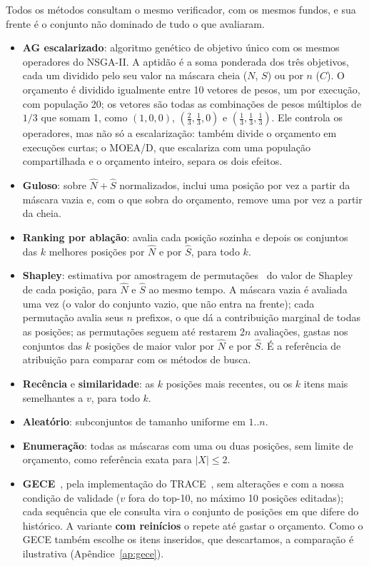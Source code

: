 Todos os métodos consultam o mesmo verificador, com os mesmos fundos, e sua
frente é o conjunto não dominado de tudo o que avaliaram.
\begin{itemize}
  \item \textbf{AG escalarizado}: algoritmo genético de objetivo único com os
        mesmos operadores do NSGA-II. A aptidão é a soma ponderada dos três
        objetivos, cada um dividido pelo seu valor na máscara cheia ($N$, $S$)
        ou por $n$ ($C$). O orçamento é dividido igualmente entre 10 vetores de
        pesos, um por execução, com população 20; os vetores são todas as
        combinações de pesos múltiplos de $1/3$ que somam 1, como
        $(1,0,0)$, $(\tfrac23,\tfrac13,0)$ e $(\tfrac13,\tfrac13,\tfrac13)$. Ele controla os operadores, mas não só a escalarização: também
        divide o orçamento em execuções curtas; o MOEA/D, que escalariza com
        uma população compartilhada e o orçamento inteiro, separa os dois
        efeitos.
  \item \textbf{Guloso}: sobre $\hat N + \hat S$ normalizados, inclui uma
        posição por vez a partir da máscara vazia e, com o que sobra do
        orçamento, remove uma por vez a partir da cheia.
  \item \textbf{Ranking por ablação}: avalia cada posição sozinha e depois os
        conjuntos das $k$ melhores posições por $\hat N$ e por $\hat S$, para
        todo $k$.
  \item \textbf{Shapley}: estimativa por amostragem de
        permutações~\cite{strumbelj2014shapley} do valor de Shapley de cada
        posição, para $\hat N$ e $\hat S$ ao mesmo tempo. A máscara vazia é
        avaliada uma vez (o valor do conjunto vazio, que não entra na frente);
        cada permutação avalia seus $n$ prefixos, o que dá a contribuição
        marginal de todas as posições; as permutações seguem até restarem $2n$
        avaliações, gastas nos conjuntos das $k$ posições de maior valor por
        $\hat N$ e por $\hat S$. É a referência de atribuição para comparar com
        os métodos de busca.
  \item \textbf{Recência} e \textbf{similaridade}: as $k$ posições mais
        recentes, ou os $k$ itens mais semelhantes a $v$, para todo $k$.
  \item \textbf{Aleatório}: subconjuntos de tamanho uniforme em $1..n$.
  \item \textbf{Enumeração}: todas as máscaras com uma ou duas posições, sem
        limite de orçamento, como referência exata para $|X|\le2$.
  \item \textbf{GECE}~\cite{scarcelli2025gece}, pela implementação do
        TRACE~\cite{kim2026trace}, sem alterações e com a nossa condição de
        validade ($v$ fora do top-10, no máximo 10 posições editadas); cada
        sequência que ele consulta vira o conjunto de posições em que difere
        do histórico. A variante \textbf{com reinícios} o repete até gastar o
        orçamento. Como o GECE também escolhe os itens inseridos, que
        descartamos, a comparação é ilustrativa (Apêndice~\ref{ap:gece}).
\end{itemize}
